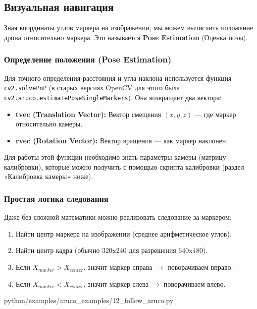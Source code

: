 \subsection{Визуальная навигация}

Зная координаты углов маркера на изображении, мы можем вычислить положение дрона относительно маркера. Это называется \textbf{Pose Estimation} (Оценка позы).

\subsubsection*{Определение положения (Pose Estimation)}
Для точного определения расстояния и угла наклона используется функция \texttt{cv2.solvePnP} (в старых версиях OpenCV для этого была \texttt{cv2.aruco.estimatePoseSingleMarkers}).
Она возвращает два вектора:
\begin{itemize}
    \item \textbf{tvec (Translation Vector):} Вектор смещения $(x, y, z)$ — где маркер относительно камеры.
    \item \textbf{rvec (Rotation Vector):} Вектор вращения — как маркер наклонен.
\end{itemize}

Для работы этой функции необходимо знать параметры камеры (матрицу калибровки), которые можно получить с помощью скрипта калибровки (раздел «Калибровка камеры» ниже).

\subsubsection*{Простая логика следования}
Даже без сложной математики можно реализовать следование за маркером:
\begin{enumerate}
    \item Найти центр маркера на изображении (среднее арифметическое углов).
    \item Найти центр кадра (обычно 320x240 для разрешения 640x480).
    \item Если $X_{marker} > X_{center}$, значит маркер справа $\rightarrow$ поворачиваем вправо.
    \item Если $X_{marker} < X_{center}$, значит маркер слева $\rightarrow$ поворачиваем влево.
\end{enumerate}

\begin{codefile}[python]{python/examples/aruco_examples/12_follow_aruco.py}
\end{codefile}

